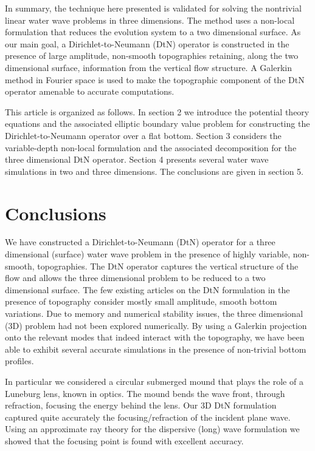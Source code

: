 \documentclass[11pt]{article}
\begin{document}
In summary, the technique here presented is validated 
for solving the nontrivial linear water wave problems in three dimensions. The method uses a non-local 
formulation that reduces the evolution system to a two dimensional surface. As our main 
goal, a Dirichlet-to-Neumann (DtN) operator
is constructed in the presence of large amplitude, non-smooth 
topographies retaining, along the two dimensional surface, information from the vertical flow structure.  
A Galerkin method in Fourier space is used to make the topographic component of the DtN operator
amenable to accurate computations. 

This article is organized as follows. In section 2 we  introduce the potential theory equations and the associated
elliptic boundary value problem for constructing the Dirichlet-to-Neumann operator over a flat bottom. 
Section 3 considers  the variable-depth non-local formulation and the associated decomposition for the 
three dimensional DtN operator.
Section 4 presents several water wave simulations in two and three dimensions. 
The conclusions are given in section 5.









\section{Conclusions}

We have constructed a  Dirichlet-to-Neumann (DtN) operator  for a three dimensional (surface) water wave problem in the 
presence of  highly variable, non-smooth, topographies.  The DtN operator captures the vertical structure of the flow and
allows the three dimensional problem to be reduced to a two dimensional surface. The few existing articles on the DtN 
formulation in the presence of topography consider mostly small amplitude, smooth bottom variations.  Due to memory and
numerical stability issues, the three dimensional (3D) problem had not been explored numerically. By using a Galerkin projection
onto the relevant modes that indeed interact with the topography, we have been able to exhibit several accurate simulations
in the presence of non-trivial bottom profiles. 

In particular we considered a circular submerged mound that plays the role of a Luneburg lens, known in optics. The mound
bends the wave front, through refraction, focusing the energy behind the lens.  Our 3D DtN  formulation captured quite accurately 
the focusing/refraction of the incident plane wave. Using an approximate ray theory for the dispersive (long) wave formulation
we showed that the focusing point is found with excellent accuracy. 
\end{document}

